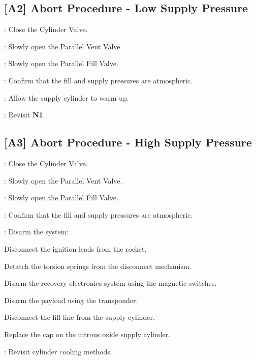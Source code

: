 \subsection{[A2] Abort Procedure - Low Supply Pressure}
\begin{checklist}
    \item \primary{}: Close the Cylinder Valve.
    \item \primary{}: Slowly open the Parallel Vent Valve.
    \item \primary{}: Slowly open the Parallel Fill Valve.
    \item \control{}: Confirm that the fill and supply pressures are atmospheric.
    \item \primary{}: Allow the supply cylinder to warm up.
    \item \ops{}: Revisit \textbf{N1}.
\end{checklist}
\setcounter{checklistnum}{0}

\subsection{[A3] Abort Procedure - High Supply Pressure}
\begin{checklist}
    \item \primary{}: Close the Cylinder Valve.
    \item \primary{}: Slowly open the Parallel Vent Valve.
    \item \primary{}: Slowly open the Parallel Fill Valve.
    \item \control{}: Confirm that the fill and supply pressures are atmospheric.
    \item \primary{}: Disarm the system:
        \begin{checklist}    
            \item Disconnect the ignition leads from the rocket.
            \item Detatch the torsion springs from the disconnect mechanism.
            \item Disarm the recovery electronics system using the magnetic switches.
            \item Disarm the payload using the transponder.
            \item Disconnect the fill line from the supply cylinder.
            \item Replace the cap on the nitrous oxide supply cylinder.
        \end{checklist}
    \item \ops{}: Revisit cylinder cooling methods.
\end{checklist}
\setcounter{checklistnum}{0}

